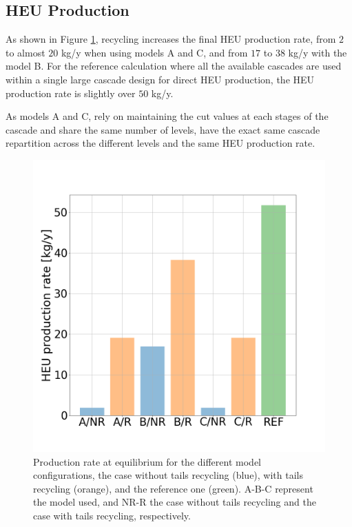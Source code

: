 \subsection{\gls{HEU} Production}

As shown in Figure \ref{fig:HEU_rate}, recycling increases the final \gls{HEU}
production rate, from $2$ to almost $20$ kg/y when using models A and C, and from
$17$ to $38$ kg/y with the model B. For the reference calculation where all the
available cascades are used within a single large cascade design for direct
\gls{HEU} production, the \gls{HEU} production rate is slightly over $50$ kg/y.


As models A and C, rely on maintaining the cut values at each stages of the
cascade and share the same number of levels, have the exact same cascade
repartition across the different levels and the same \gls{HEU} production rate.

\begin{figure}[h!] %
    \centering
    \includegraphics[scale=0.25]{HEU_prod_rate}
    \caption{Production rate at equilibrium for the different model
        configurations, the case without tails recycling (blue), with tails
        recycling (orange), and the reference one (green). A-B-C represent
        the model used, and NR-R the case without tails recycling and the case
        with tails recycling, respectively.}
    \label{fig:HEU_rate}
\end{figure}
